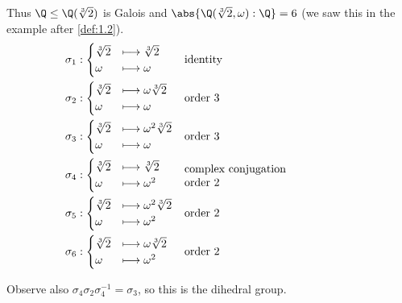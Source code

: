 \documentclass{article}
\begin{document}
\begin{eg}
\begin{enumerate}[label=(\arabic*)]
            Thus $\Q \leq \Q(\sqrt[3]{2})$ is Galois and $\abs{\Q(\sqrt[3]{2}, \omega):\Q} = 6$ (we saw this in the example after \cref{def:1.2}).
            \begin{align*}
                \sigma_1&:
                    \begin{cases}
                        \sqrt[3]{2} &\longmapsto \sqrt[3]{2} \\ \omega &\longmapsto \omega
                    \end{cases}
                    &&\text{identity} \\
                \sigma_2&:
                    \begin{cases}
                        \sqrt[3]{2} &\longmapsto \omega\sqrt[3]{2} \\ \omega &\longmapsto \omega
                    \end{cases}
                    &&\text{order } 3 \\
                \sigma_3&:
                    \begin{cases}
                        \sqrt[3]{2} &\longmapsto \omega^2\sqrt[3]{2} \\ \omega &\longmapsto \omega
                    \end{cases}
                    &&\text{order } 3 \\
                \sigma_4&:
                    \begin{cases}
                        \sqrt[3]{2} &\longmapsto \sqrt[3]{2} \\ \omega &\longmapsto \omega^2
                    \end{cases}
                    &&\parbox{15em}{complex conjugation\\ order $2$} \\
                \sigma_5&:
                    \begin{cases}
                        \sqrt[3]{2} &\longmapsto \omega^2\sqrt[3]{2} \\ \omega &\longmapsto \omega^2
                    \end{cases}
                    &&\text{order } 2 \\
                \sigma_6&:
                    \begin{cases}
                        \sqrt[3]{2} &\longmapsto \omega\sqrt[3]{2} \\ \omega &\longmapsto \omega^2
                    \end{cases}
                    &&\text{order } 2 \\
            \end{align*}

            Observe also $\sigma_4 \sigma_2 \sigma_4^{-1} = \sigma_3$, so this is the dihedral group.
    \end{enumerate}
\end{eg}
\end{document}
